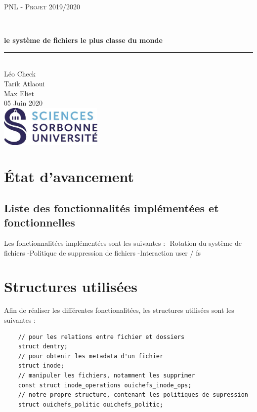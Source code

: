 \documentclass{article}
\date{\today}
\author{Léo Check\\ Tarik Atlaoui \\ Max Eliet}
\begin{document}
\begin{titlepage}
	\enlargethispage{2cm}
	\newcommand{\HRule}{\rule{\linewidth}{0.5mm}}
	\center
	\textsc{\LARGE
	PNL - Projet 2019/2020 
	} \\[1cm]
	\HRule \\[0.4cm]
	{ \huge \bfseries le système de fichiers le plus classe du monde \\[0.15cm] }
	\HRule \\[4cm]
	\large{Léo Check \\[3mm] Tarik Atlaoui \\[3mm] Max Eliet} \\[3cm]
	05 Juin 2020 \\[3cm]
	\hfill \includegraphics[width=5cm]{logoSU.jpg}
\end{titlepage}

	\newpage
	\section{État d'avancement}
	\subsection{Liste des fonctionnalités implémentées et fonctionnelles}
	Les fonctionnalitées implémentées sont les suivantes :
	\newline	
	-Rotation du système de fichiers
	\newline
	-Politique de suppression de fichiers
	\newline
	-Interaction user / fs
	\section{Structures utilisées}
	Afin de réaliser les différentes fonctionalitées, les structures utilisées sont les suivantes :
	\begin{lstlisting}
	// pour les relations entre fichier et dossiers
	struct dentry;
	// pour obtenir les metadata d'un fichier
	struct inode;
	// manipuler les fichiers, notamment les supprimer
	const struct inode_operations ouichefs_inode_ops;
	// notre propre structure, contenant les politiques de supression
	struct ouichefs_politic ouichefs_politic;
	\end{lstlisting}
\end{document}
